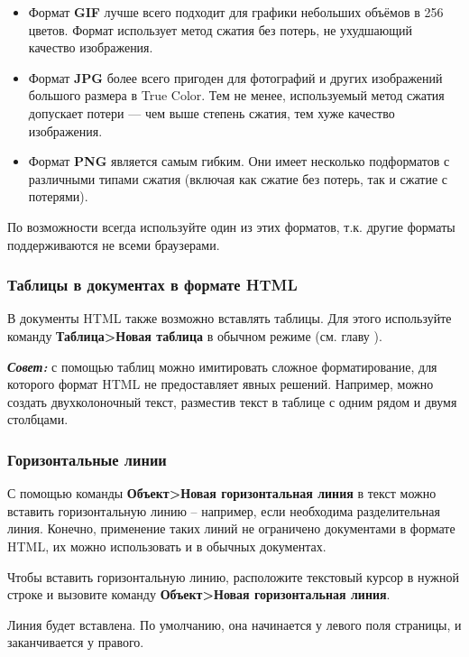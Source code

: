 ﻿\documentclass[a4paper,10pt]{article}
\begin{document}
\begin{itemize}
 \item Формат \textbf{GIF} лучше всего подходит для графики небольших объёмов в 256 цветов. Формат использует метод сжатия без потерь, не ухудшающий качество изображения.
 \item Формат \textbf{JPG} более всего пригоден для фотографий и других изображений большого размера в True Color. Тем не менее, используемый метод сжатия допускает потери — чем выше степень сжатия, тем хуже качество изображения.
 \item Формат \textbf{PNG} является самым гибким. Они имеет несколько подформатов с различными типами сжатия (включая как сжатие без потерь, так и сжатие с потерями).
\end{itemize}

По возможности всегда используйте один из этих форматов, т.к. другие форматы поддерживаются не всеми браузерами.

\subsubsection{Таблицы в документах в формате HTML}
В документы HTML также возможно вставлять таблицы. Для этого используйте команду \textbf{Таблица>Новая таблица} в обычном режиме (см. главу ).

\begin{mdframed}[backgroundcolor=blue!10]
\textbf{\textit{Совет:}} с помощью таблиц можно имитировать сложное форматирование, для которого формат HTML не предоставляет явных решений. Например, можно создать двухколоночный текст, разместив текст в таблице с одним рядом и двумя столбцами.
\end{mdframed}

\subsubsection{Горизонтальные линии}
С помощью команды \textbf{Объект>Новая горизонтальная линия} в текст можно вставить горизонтальную линию -- например, если необходима разделительная линия. Конечно, применение таких линий не ограничено документами в формате HTML, их можно использовать и в обычных документах.

Чтобы вставить горизонтальную линию, расположите текстовый курсор в нужной строке и вызовите команду \textbf{Объект>Новая горизонтальная линия}.

Линия будет вставлена. По умолчанию, она начинается у левого поля страницы, и заканчивается у правого.
\end{document}
